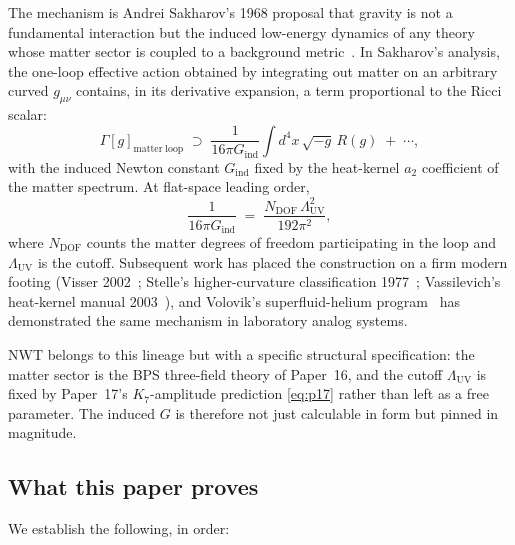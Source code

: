 \documentclass[11pt]{article}
\begin{document}
The mechanism is Andrei Sakharov's 1968 proposal that gravity is
not a fundamental interaction but the induced low-energy dynamics
of any theory whose matter sector is coupled to a background
metric~\cite{sakharov1968}.  In Sakharov's analysis, the one-loop
effective action obtained by integrating out matter on an
arbitrary curved $g_{\mu\nu}$ contains, in its derivative
expansion, a term proportional to the Ricci scalar:
\begin{equation}
  \Gamma[g]_{\mathrm{matter\;loop}}
   \;\supset\;
   \frac{1}{16\pi G_{\mathrm{ind}}}
     \int d^4 x\,\sqrt{-g}\,R(g) \;+\; \cdots,
\end{equation}
with the induced Newton constant $G_{\mathrm{ind}}$ fixed by the
heat-kernel $a_2$ coefficient of the matter spectrum.  At
flat-space leading order,
\begin{equation}
  \frac{1}{16\pi G_{\mathrm{ind}}}
    \;=\;
    \frac{N_{\mathrm{DOF}}\,\Lambda_{\mathrm{UV}}^2}{192\pi^2},
  \label{eq:sakharov-LO}
\end{equation}
where $N_{\mathrm{DOF}}$ counts the matter degrees of freedom
participating in the loop and $\Lambda_{\mathrm{UV}}$ is the cutoff.
Subsequent work has placed the construction on a firm modern
footing (Visser 2002~\cite{visser2002}; Stelle's higher-curvature
classification 1977~\cite{stelle1977}; Vassilevich's heat-kernel
manual 2003~\cite{vassilevich2003}), and Volovik's superfluid-helium
program~\cite{volovik2003} has demonstrated the same mechanism in
laboratory analog systems.

NWT belongs to this lineage but with a specific structural
specification: the matter sector is the BPS three-field theory of
Paper~16, and the cutoff $\Lambda_{\mathrm{UV}}$ is fixed by
Paper~17's $K_7$-amplitude prediction
\eqref{eq:p17} rather than left as a free parameter.  The induced
$G$ is therefore not just calculable in form but pinned in
magnitude.

\subsection{What this paper proves}

We establish the following, in order:
\end{document}
